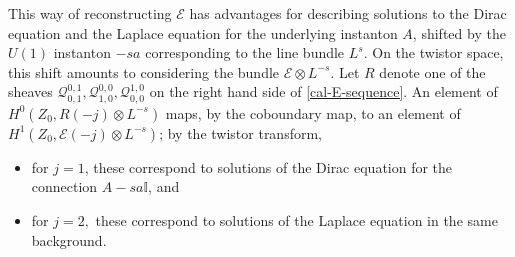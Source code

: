 \documentclass[12pt]{article}
\theoremstyle{definition}
\theoremstyle{remark}
\numberwithin{theorem}{section}
\def\bI{{\mathbb {I}}}
\def\pE{{\mathcal E}}
\def\pQ{{\mathcal Q}}
\begin{document}
This way of reconstructing $\pE$ has advantages for describing solutions to the Dirac equation and the Laplace equation for the underlying instanton $A$, shifted by the $U(1)$ instanton $-sa$ corresponding to the line bundle $L^s.$ On the twistor space, this shift amounts to considering the bundle $\pE\otimes L^{-s}$. Let $R$ denote one of the sheaves $\pQ_{0,1}^{0,1},  \pQ_{ 1,0}^{0,0}, \pQ_{0,0}^{1,0}$ on the right hand side of \eqref{cal-E-sequence}. An element of $H^0(Z_0, R(-j)\otimes L^{-s})$ maps, by the coboundary map, to an element of $H^1(Z_0, \pE(-j)\otimes L^{-s})$; by the twistor transform,
\begin{itemize}
\item
for $j= 1$, these correspond to solutions of the Dirac equation for the connection $A-sa\bI$, and 
\item
for $j = 2,$ these correspond 
to solutions of the Laplace equation in the same background.
\end{itemize}
 
\end{document}
